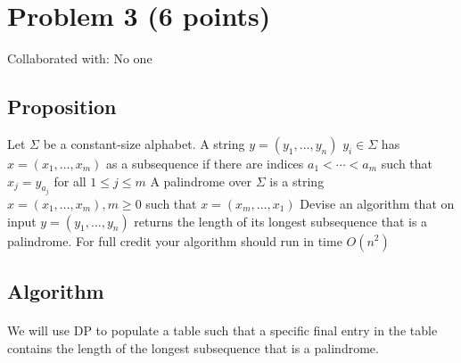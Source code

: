 \documentclass{article}
\begin{document}
\newpage
\section{Problem 3 (6 points)}
Collaborated with: No one

\subsection{Proposition}
Let \(\Sigma \) be a constant-size alphabet. A string \(y = (y_1,\ldots, y_n)\)
\(y_i \in \Sigma \)  has \(x = (x_1,\dots, x_m)\) as a subsequence if there
are indices \(a_1 < \cdots < a_m\) such that \(x_j = y_{a_j}\)
for all \(1 \leq j \leq m\)
A palindrome over \(\Sigma \) is a string \(x = (x_1,\dots, x_m), m \geq 0\)  such that
\(x = (x_m,\dots, x_1)\)
Devise an algorithm that on input \(y = (y_1,\dots, y_n)\) returns the length of its longest
subsequence that is a palindrome. For full credit your algorithm should run in time \(O(n^2)\)

\subsection{Algorithm}
\paragraph{\indent}We will use DP to populate a table such that a specific
final entry in the table contains the length of the longest subsequence that is a palindrome.
\end{document}
